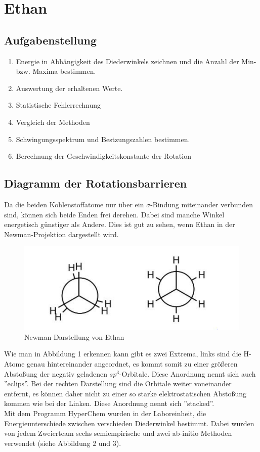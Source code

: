 \section{Ethan}

\subsection{Aufgabenstellung}

\begin{enumerate}
    \item Energie in Abhängigkeit des Diederwinkels zeichnen und die Anzahl der Min- bzw. Maxima bestimmen.
    \item Auswertung der erhaltenen Werte.
    \item Statistische Fehlerrechnung
    \item Vergleich der Methoden 
    \item Schwingungsspektrum und Bestzungszahlen bestimmen.
    \item Berechnung der Geschwindigkeitskonstante der Rotation 
\end{enumerate}

\subsection{Diagramm der Rotationsbarrieren}
Da die beiden Kohlenstoffatome nur über ein $\sigma$-Bindung miteinander verbunden sind, können sich beide Enden frei derehen. Dabei sind 
manche Winkel energetisch günstiger als Andere. Dies ist gut zu sehen, wenn Ethan in der Newman-Projektion dargestellt wird.

\begin{figure}[H]
    \centering
    \includegraphics[scale=.7]{../src/img/newmanEthan.png}
    \caption{Newman Darstellung von Ethan}
\end{figure}


Wie man in Abbildung 1 erkennen kann gibt es zwei Extrema, links sind die H-Atome genau hintereinander angeordnet, es kommt somit zu einer größeren
Abstoßung der negativ geladenen $sp^3$-Orbitale. Diese Anordnung nennt sich auch ''eclips''. Bei der rechten Darstellung sind die Orbitale weiter
voneinander entfernt, es können daher nicht zu einer so starke elektrostatischen Abstoßung kommen wie bei der Linken. Diese Anordnung nennt sich ''stacked''.\\
Mit dem Programm HyperChem wurden in der Laboreinheit, die Energieunterschiede zwischen verschieden Diederwinkel bestimmt. Dabei wurden
von jedem Zweierteam sechs semiempirische und zwei ab-initio Methoden verwendet (siehe Abbildung 2 und 3).


